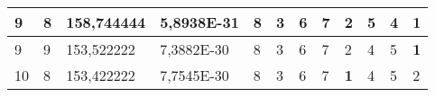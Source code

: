 \documentclass[conference]{IEEEtran}
\begin{document}
\begin{table*}[]
\begin{tabular}{|llll|llllllll|}
\multicolumn{1}{|l|}{9}                                                     & \multicolumn{1}{l|}{8}                                                        & \multicolumn{1}{l|}{158,744444}                                                   & 5,8938E-31                     & \multicolumn{1}{l|}{8}                                                  & \multicolumn{1}{l|}{3}                                                  & \multicolumn{1}{l|}{6}                                                  & \multicolumn{1}{l|}{7}                                                  & \multicolumn{1}{l|}{2}                                                  & \multicolumn{1}{l|}{5}                                                  & \multicolumn{1}{l|}{4}                                                  & \textbf{1}                 \\ \hline
\multicolumn{1}{|l|}{9}                                                     & \multicolumn{1}{l|}{9}                                                        & \multicolumn{1}{l|}{153,522222}                                                   & 7,3882E-30                     & \multicolumn{1}{l|}{8}                                                  & \multicolumn{1}{l|}{3}                                                  & \multicolumn{1}{l|}{6}                                                  & \multicolumn{1}{l|}{7}                                                  & \multicolumn{1}{l|}{2}                                                  & \multicolumn{1}{l|}{4}                                                  & \multicolumn{1}{l|}{5}                                                  & \textbf{1}                 \\ \hline
\multicolumn{1}{|l|}{10}                                                    & \multicolumn{1}{l|}{8}                                                        & \multicolumn{1}{l|}{153,422222}                                                   & 7,7545E-30                     & \multicolumn{1}{l|}{8}                                                  & \multicolumn{1}{l|}{3}                                                  & \multicolumn{1}{l|}{6}                                                  & \multicolumn{1}{l|}{7}                                                  & \multicolumn{1}{l|}{\textbf{1}}                                         & \multicolumn{1}{l|}{4}                                                  & \multicolumn{1}{l|}{5}                                                  & 2                          \\ \hline

\end{tabular}
\end{table*}
\end{document}

